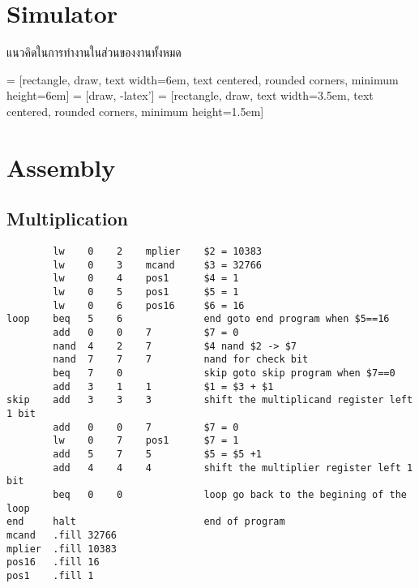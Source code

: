 \documentclass{article}
\begin{document}
\newpage
\section{Simulator}
แนวคิดในการทำงานในส่วนของงานทั้งหมด
\\
\begin{center}
     = [rectangle, draw, 
        text width=6em, text centered, rounded corners, minimum height=6em]
     = [draw, -latex']
     = [rectangle, draw, 
        text width=3.5em, text centered, rounded corners, minimum height=1.5em]
    \end{center}

\newpage
\section{Assembly}
\subsection{Multiplication}
\begin{lstlisting}
        lw    0    2    mplier    $2 = 10383
        lw    0    3    mcand     $3 = 32766
        lw    0    4    pos1      $4 = 1
        lw    0    5    pos1      $5 = 1
        lw    0    6    pos16     $6 = 16
loop    beq   5    6              end goto end program when $5==16
        add   0    0    7         $7 = 0
        nand  4    2    7         $4 nand $2 -> $7
        nand  7    7    7         nand for check bit
        beq   7    0              skip goto skip program when $7==0
        add   3    1    1         $1 = $3 + $1
skip    add   3    3    3         shift the multiplicand register left 1 bit
        add   0    0    7         $7 = 0
        lw    0    7    pos1      $7 = 1
        add   5    7    5         $5 = $5 +1
        add   4    4    4         shift the multiplier register left 1 bit
        beq   0    0              loop go back to the begining of the loop
end     halt                      end of program
mcand   .fill 32766
mplier  .fill 10383
pos16   .fill 16
pos1    .fill 1
\end{lstlisting}
\end{document}
